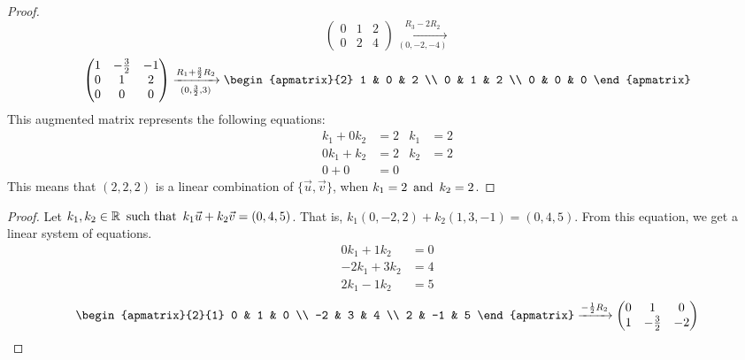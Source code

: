 \documentclass{article}
\begin{document}
\begin{enumerate}
\begin{proof}
\[\begin{pmatrix}
                0 & 1            & 2  \\
                0 & 2            & 4
            \end{pmatrix} \xrightarrow[(0,-2,-4)]{R_3 - 2R_2}
        \]
        \[
            \begin{pmatrix}
                1 & -\frac{3}{2} & -1 \\
                0 & 1            & 2  \\
                0 & 0            & 0
            \end{pmatrix} \xrightarrow[(0,\frac{3}{2},3)]{R_1 + \frac{3}{2}R_2}
            \begin{apmatrix}{2}
                1 & 0 & 2 \\
                0 & 1 & 2 \\
                0 & 0 & 0
            \end{apmatrix}
        \]
        This augmented matrix represents the following equations:
        \begin{align*}
            k_1 + 0k_2 & = 2 & k_1 & = 2 \\
            0k_1 + k_2 & = 2 & k_2 & = 2 \\
            0 + 0      & = 0
        \end{align*}
        This means that $(2,2,2)$ is a linear combination of $\{\vec{u},\vec{v}\}$, when $k_1 = 2 \operatorname{~\text{and}~} k_2 = 2$.
    \end{proof}
    \begin{proof}
        Let $k_1,k_2 \in \mathbb{R} \operatorname{~\text{such that}~} k_1\vec{u} + k_2\vec{v} = (0,4,5)$. That is, $k_1(0,-2,2) + k_2(1,3,-1) = (0,4,5)$. From this equation, we get a linear system of equations.
        \begin{align*}
            0k_1 + 1k_2  & = 0 \\
            -2k_1 + 3k_2 & = 4 \\
            2k_1 - 1k_2  & = 5
        \end{align*}
        \[
            \begin{apmatrix}{2}{1}
                0 & 1 & 0 \\
                -2 & 3 & 4 \\
                2 & -1 & 5
            \end{apmatrix} \xrightarrow{-\frac{1}{2}R_2}
            \begin{pmatrix}
                0 & 1            & 0  \\
                1 & -\frac{3}{2} & -2 \\

\end{pmatrix}\]
\end{proof}
\end{enumerate}
\end{document}

